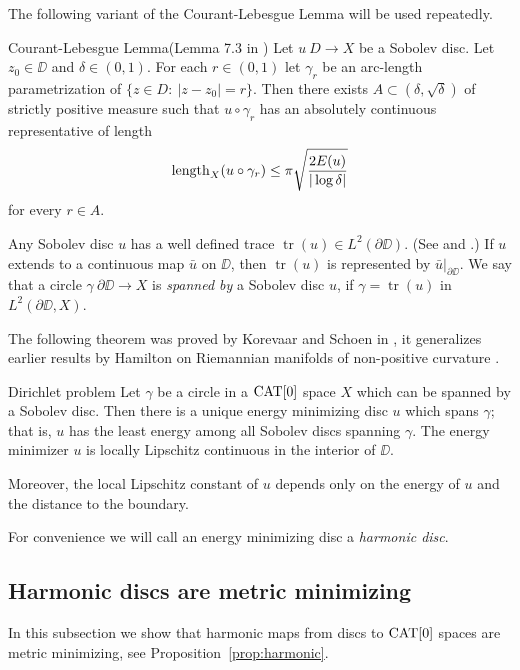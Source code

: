 \documentclass[a4paper,10pt]{amsart}
\begin{document}
The following variant of the Courant-Lebesgue Lemma will be used repeatedly.

\begin{thm}{Courant-Lebesgue Lemma}(Lemma 7.3 in \cite{LW})\label{lem:CL}
Let $u\:D\to X$ be a Sobolev disc. Let $z_0\in\DD$ and $\delta\in(0,1)$. For each $r\in(0,1)$
let $\gamma_r$ be an arc-length parametrization of $\{z\in D:\ |z-z_0|=r\}$. Then there exists
$A\subset (\delta,\sqrt{\delta})$ of strictly positive measure such that $u\circ\gamma_r$
has an absolutely continuous representative of length
$$
\mathop{\rm length}\nolimits_X(u\circ\gamma_r)\leq\pi\sqrt{\frac{2E(u)}{|\log\delta|}}
$$
for every $r\in A$.
\end{thm}






Any Sobolev disc $u$ has a well defined trace $\operatorname{tr}(u)\in L^2(\partial\DD)$. (See \cite{KS} and \cite{LW}.)
If $u$ extends to a continuous map $\bar u$ on $\DD$, then $\operatorname{tr}(u)$ is represented by $\bar u|_{\partial\DD}$. 
We say that a circle $\gamma\:\partial\DD\to X$ is {\em spanned by} a Sobolev disc $u$, if $\gamma=\operatorname{tr}(u)$ in 
$L^2(\partial\DD,X)$.


The following theorem was proved by Korevaar and Schoen in \cite{KS}, it generalizes earlier results by Hamilton on 
Riemannian manifolds of non-positive
curvature \cite{H}.

\begin{thm}{Dirichlet problem}\label{thm:dirichlet}
Let $\gamma$ be a circle in a $\mathop{\rm CAT}\nolimits[0]$ space $X$ which can be spanned by a Sobolev disc. 
Then there is a unique energy minimizing disc $u$ which spans $\gamma$; 
that is, $u$
has the least energy among all Sobolev discs spanning $\gamma$. 
The energy minimizer $u$ is locally Lipschitz continuous in the interior of $\DD$.

Moreover, the local Lipschitz constant of $u$ depends only on the energy of $u$ and the distance to the boundary.
\end{thm}

For convenience we will call an energy minimizing disc a {\em harmonic disc}.


\subsection{Harmonic discs are metric minimizing}

In this subsection we show that harmonic maps from discs to $\mathop{\rm CAT}\nolimits[0]$ spaces are metric minimizing, see Proposition~\ref{prop:harmonic}.
\end{document}
